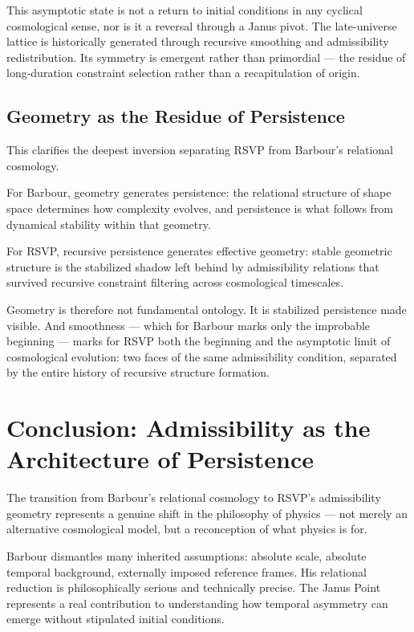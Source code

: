 \documentclass[12pt, a4paper]{article}
\begin{document}
This asymptotic state is not a return to initial conditions in any cyclical
cosmological sense, nor is it a reversal through a Janus pivot. The
late-universe lattice is historically generated through recursive smoothing
and admissibility redistribution. Its symmetry is emergent rather than
primordial — the residue of long-duration constraint selection rather than
a recapitulation of origin.

\subsection{Geometry as the Residue of Persistence}

This clarifies the deepest inversion separating RSVP from Barbour's
relational cosmology.

For Barbour, geometry generates persistence: the relational structure of
shape space determines how complexity evolves, and persistence is what
follows from dynamical stability within that geometry.

For RSVP, recursive persistence generates effective geometry: stable
geometric structure is the stabilized shadow left behind by admissibility
relations that survived recursive constraint filtering across cosmological
timescales.

Geometry is therefore not fundamental ontology. It is stabilized persistence
made visible. And smoothness — which for Barbour marks only the improbable
beginning — marks for RSVP both the beginning and the asymptotic limit of
cosmological evolution: two faces of the same admissibility condition,
separated by the entire history of recursive structure formation.

\section{Conclusion: Admissibility as the Architecture of Persistence}

The transition from Barbour's relational cosmology to RSVP's admissibility
geometry represents a genuine shift in the philosophy of physics — not merely
an alternative cosmological model, but a reconception of what physics is for.

Barbour dismantles many inherited assumptions: absolute scale, absolute
temporal background, externally imposed reference frames. His relational
reduction is philosophically serious and technically precise. The Janus Point
represents a real contribution to understanding how temporal asymmetry can
emerge without stipulated initial conditions.
\end{document}
